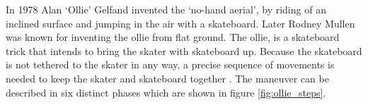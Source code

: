 \documentclass[default,iicol]{sn-jnl}
\begin{document}
In 1978 Alan `Ollie' Gelfand invented the `no-hand aerial', by riding of an
inclined surface and jumping in the air with a skateboard. Later Rodney Mullen
was known for inventing the ollie from flat ground. The ollie, is a skateboard
trick that intends to bring the skater with skateboard up. Because the
skateboard is not tethered to the skater in any way, a precise sequence of
movements is needed to keep the skater and skateboard together
\cite{frederick_biomechanics_2006}. The maneuver can be described in six
distinct phases which are shown in figure \ref{fig:ollie_steps}.


\begin{figure}[!t]
\captionsetup[subfigure]{labelformat=empty}

\end{figure}
\end{document}
